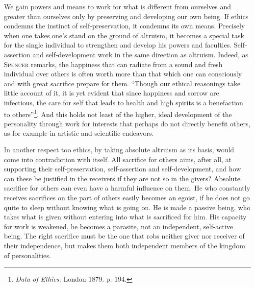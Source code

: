 \documentclass[12pt,a4paper,openany]{book}
\newcommand{\opage}[1]{\marginnote{\footnotesize\textit{[#1]}}}
\begin{document}
We gain powers and means to work for what is different from ourselves and greater than ourselves only by
preserving and developing our own being. If ethics condemns the instinct of self-preservation, it condemns
its own means. Precisely when one takes one's stand on the ground of altruism, it becomes a special task for
the single individual to strengthen and develop his powers and faculties. Self-assertion and self-development
work in the same direction as altruism. Indeed, as \textsc{Spencer} remarks, the happiness that can radiate
from a sound and fresh individual over others is often worth more than that which one can consciously and
with great sacrifice prepare for them. ``Though our ethical reasonings take little account of it, it is yet
evident that since happiness and sorrow are infectious, the care for self that leads to health and high
spirits is a benefaction to others''\footnote[1]{\textit{Data of Ethics.} London 1879. p. 194.}. %
And this holds not least of the higher, ideal development of the personality through work for interests that
perhaps do not directly benefit others, as for example in artistic and scientific endeavors.

In another respect too ethics, by taking absolute altruism as its basis, would come into contradiction with
itself. All sacrifice for others aims, after all, at supporting their self-preservation, self-assertion and
self-development, and how can these be justified in the receivers if they are not so in the givers? Absolute
sacrifice for others can even have a harmful influence on them. He who constantly receives sacrifices on the
part of others easily becomes an egoist, if he does not go quite to sleep without knowing what is going on.
He is made a passive being, who takes what is given without entering into what is sacrificed for him. His
capacity for work is weakened, he becomes a parasite, not an independent, self-active being. The right
sacrifice must be the one that robs neither giver nor receiver of their independence,
\opage{168}but makes them both independent members of the kingdom of personalities.
\end{document}
